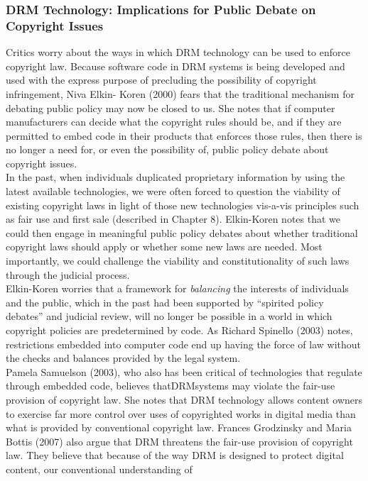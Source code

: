 \documentclass[12pt]{article}
\theoremstyle{definition}
\begin{document}
\subsubsection{DRM Technology: Implications for Public Debate on Copyright Issues}
Critics worry about the ways in which DRM technology can be used to enforce copyright
law. Because software code in DRM systems is being developed and used with the
express purpose of precluding the possibility of copyright infringement, Niva Elkin-
Koren (2000) fears that the traditional mechanism for debating public policy may now be closed to us. She notes that if computer manufacturers can decide what the copyright
rules should be, and if they are permitted to embed code in their products that enforces
those rules, then there is no longer a need for, or even the possibility of, public policy
debate about copyright issues.\\
In the past, when individuals duplicated proprietary information by using the latest
available technologies, we were often forced to question the viability of existing copyright
laws in light of those new technologies vis-a-vis principles such as fair use and first sale
(described in Chapter 8). Elkin-Koren notes that we could then engage in meaningful
public policy debates about whether traditional copyright laws should apply or whether
some new laws are needed. Most importantly, we could challenge the viability and
constitutionality of such laws through the judicial process.\\
Elkin-Koren worries that a framework for \textit{balancing} the interests of individuals and
the public, which in the past had been supported by “spirited policy debates” and
judicial review, will no longer be possible in a world in which copyright policies are
predetermined by code. As Richard Spinello (2003) notes, restrictions embedded into
computer code end up having the force of law without the checks and balances provided
by the legal system.\\
Pamela Samuelson (2003), who also has been critical of technologies that regulate
through embedded code, believes thatDRMsystems may violate the fair-use provision of
copyright law. She notes that DRM technology allows content owners to exercise far
more control over uses of copyrighted works in digital media than what is provided by
conventional copyright law. Frances Grodzinsky and Maria Bottis (2007) also argue that
DRM threatens the fair-use provision of copyright law. They believe that because of the
way DRM is designed to protect digital content, our conventional understanding of
\end{document}
